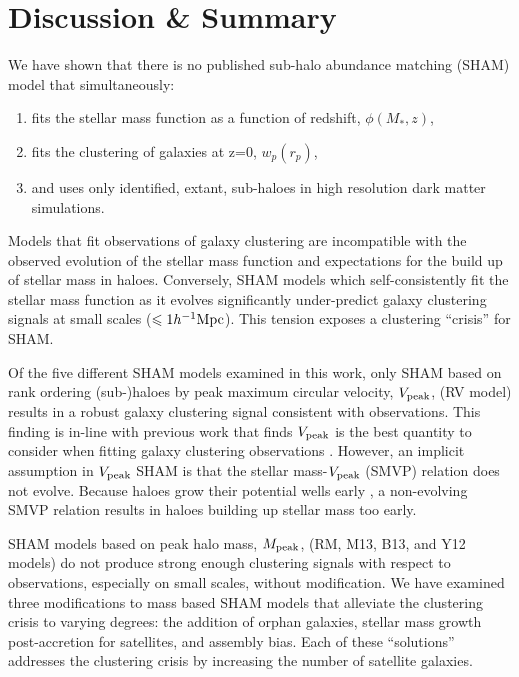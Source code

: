 \documentclass[a4paper,fleqn,usenatbib]{mnras}
\begin{document}
\section{Discussion \& Summary}

We have shown that there is no published sub-halo abundance matching (SHAM) model that simultaneously:
\begin{enumerate}
\item fits the stellar mass function as a function of redshift, $\phi(M_*,z)$,
\item fits the clustering of galaxies at z=0, $w_p(r_p)$,
\item and uses only identified, extant, sub-haloes in high resolution dark matter simulations.
\end{enumerate}
Models that fit observations of galaxy clustering are incompatible with the observed evolution of the stellar mass function and expectations for the build up of stellar mass in haloes.  Conversely, SHAM models which self-consistently fit the stellar mass function as it evolves significantly under-predict galaxy clustering signals at small scales ($\leq 1 h^{-1}{\rm Mpc}$).  This tension exposes a clustering ``crisis'' for SHAM.   

Of the five different SHAM models examined in this work, only SHAM based on rank ordering (sub-)haloes by peak maximum circular velocity, $V_{\rm peak}$, (RV  model) results in a robust galaxy clustering signal consistent with observations.  This finding is in-line with previous work that finds $V_{\rm peak}$ is the best quantity to consider when fitting galaxy clustering observations \citep{Reddick:2013gi, Lehmann:2015vi}.  However, an implicit assumption in $V_{\rm peak}$ SHAM is that the stellar mass-$V_{\rm peak}$ (SMVP) relation does not evolve. Because haloes grow their potential wells early \citep[e.g.][]{Bosch:2014cu}, a non-evolving SMVP relation results in haloes building up stellar mass too early.  

SHAM models based on peak halo mass, $M_{\rm peak}$, (RM, M13, B13, and Y12 models) do not produce strong enough clustering signals with respect to observations, especially on small scales, without modification.  We have examined three modifications to mass based SHAM models that alleviate the clustering crisis to varying degrees: the addition of orphan galaxies, stellar mass growth post-accretion for satellites, and assembly bias.  Each of these ``solutions'' addresses the clustering crisis by increasing the number of satellite galaxies.
\end{document}

